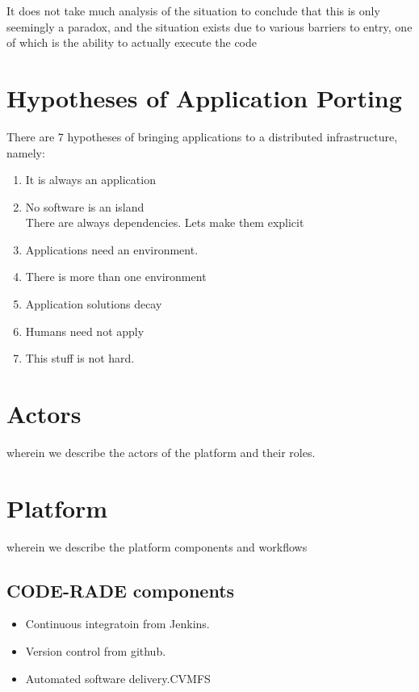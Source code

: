 \documentclass[a4paper]{jpconf}
\begin{document}
It does not take much analysis of the situation to conclude that this is only seemingly a paradox, and the situation exists due to various barriers to entry, one of which is the ability to actually execute the code


\section{Hypotheses of Application Porting}

There are 7 hypotheses of bringing applications to a distributed infrastructure, namely:
\begin{enumerate}
    \item It is always an application
    \item No software is an island\\
      There are always dependencies. Lets make them explicit
    \item Applications need an environment.\\
    \item There is more than one environment
    \item Application solutions decay
    \item Humans need not apply
    \item This stuff is not hard.
  \end{enumerate}

\section{Actors}

wherein we describe the actors of the platform and their roles.

\section{Platform}

wherein we describe the platform components and workflows

\subsection{CODE-RADE components}

\begin{itemize}
	\item Continuous integratoin from Jenkins.
    \item Version control from github.
    \item Automated software delivery.CVMFS
\end{itemize}
\end{document}
